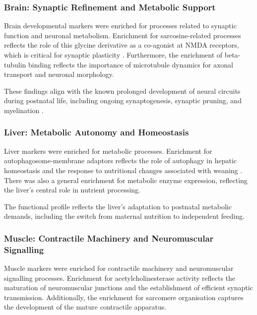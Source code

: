 \subsubsection{Brain: Synaptic Refinement and Metabolic Support}

Brain developmental markers were enriched for processes related to synaptic function and neuronal metabolism. Enrichment for sarcosine-related processes reflects the role of this glycine derivative as a co-agonist at NMDA receptors, which is critical for synaptic plasticity \parencite{zhang_glycine_2009}. Furthermore, the enrichment of beta-tubulin binding reflects the importance of microtubule dynamics for axonal transport and neuronal morphology.

These findings align with the known prolonged development of neural circuits during postnatal life, including ongoing synaptogenesis, synaptic pruning, and myelination \parencite{jiang_cellular_2016, kang_spatio-temporal_2011, semple_brain_2013}.

\subsubsection{Liver: Metabolic Autonomy and Homeostasis}

Liver markers were enriched for metabolic processes. Enrichment for autophagosome-membrane adaptors reflects the role of autophagy in hepatic homeostasis and the response to nutritional changes associated with weaning \parencite{gordillo_orchestrating_2015, pluske_gastrointestinal_2018}. There was also a general enrichment for metabolic enzyme expression, reflecting the liver's central role in nutrient processing.

The functional profile reflects the liver's adaptation to postnatal metabolic demands, including the switch from maternal nutrition to independent feeding.

\subsubsection{Muscle: Contractile Machinery and Neuromuscular Signalling}

Muscle markers were enriched for contractile machinery and neuromuscular signalling processes. Enrichment for acetylcholinesterase activity \parencite{rotundo_expression_2003} reflects the maturation of neuromuscular junctions and the establishment of efficient synaptic transmission. Additionally, the enrichment for sarcomere organisation captures the development of the mature contractile apparatus.

